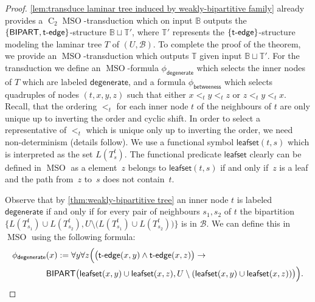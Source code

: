 \documentclass{lmcs} %
\newcommand{\MSO}{\ensuremath{\operatorname{MSO}}\xspace}
\newcommand{\CMSO}[1][]{\ensuremath{\C[#1]{\!\!}\MSO}\xspace}
\newcommand{\C}[1][]{\ensuremath{\operatorname{C}_{#1}}\xspace}
\newcommand{\betweeness}{\mathsf{betweeness}}
\newcommand{\tedge}{\ensuremath{\mathsf{t}\text-\mathsf{edge}}\xspace}
\newcommand{\BIPARTITION}{\ensuremath{\mathsf{BIPART}}\xspace}
\newcommand{\leafset}{\ensuremath{\mathsf{leafset}}\xspace}
\newcommand\DEGENERATE{\ensuremath{\mathsf{degenerate}}\xspace}
\newcommand{\ifof}{if and only if\xspace}
\renewcommand{\implies}{\rightarrow}
\begin{document}
\begin{proof}
    \autoref{lem:transduce laminar tree induced by weakly-bipartitive family} already provides a \CMSO[2]-transduction
    which on input $\mathbb{B}$ outputs the $\{\BIPARTITION, \tedge\}$-structure $\mathbb{B}\sqcup \mathbb{T}'$,
    where $\mathbb{T}'$ represents the $\{\tedge\}$-structure modeling the laminar tree $T$ of $(U,\mathcal{B})$.
    To complete the proof of the theorem, we provide an \MSO-transduction which outputs $\mathbb{T}$ given input $\mathbb{B}\sqcup \mathbb{T}'$.
    For the transduction we define an \MSO-formula $\phi_{\DEGENERATE}$ which selects the inner nodes of $T$ which are labeled $\DEGENERATE$,
    and a formula $\phi_{\betweeness}$ which selects quadruples of nodes $(t,x,y,z)$ such that either $x<_t y<_t z$ or $z<_t y<_t x$.
    Recall, that the ordering $<_t$ for each inner node $t$ of the neighbours of $t$ are only unique up to inverting the order and cyclic shift.
    In order to select a representative of $<_t$ which is unique only up to inverting the order, we need non-determinism (details follow).
    We use a functional symbol $\leafset(t,s)$ which is interpreted as the set $L(T_s^t)$.
    The functional predicate $\leafset$ clearly can be defined in \MSO as a element~$z$ belongs to $\leafset(t,s)$
    \ifof~$z$ is a leaf and the path from~$z$ to~$s$ does not contain~$t$.

    Observe that by \autoref{thm:weakly-bipartitive tree} an inner node $t$ is labeled $\DEGENERATE$
    \ifof for every pair of neighbours $s_1,s_2$ of $t$ the bipartition $\big\{L(T^t_{s_1})\cup L(T^t_{s_2}),U\setminus \big(L(T^t_{s_1})\cup L(T^t_{s_2})\big)\big\}$ is in $\mathcal{B}$.
    We can define this in \MSO using the following formula:
    \begin{align*}
        \phi_{\DEGENERATE}&(x):=\forall y \forall z\Big(\big(\tedge(x,y)\land \tedge(x,z)\big)\implies\\
        &\BIPARTITION\big(\leafset(x,y)\cup \leafset(x,z), U\setminus (\leafset(x,y)\cup \leafset(x,z))\big)\Big).
    \end{align*}


\end{proof}
\end{document}

